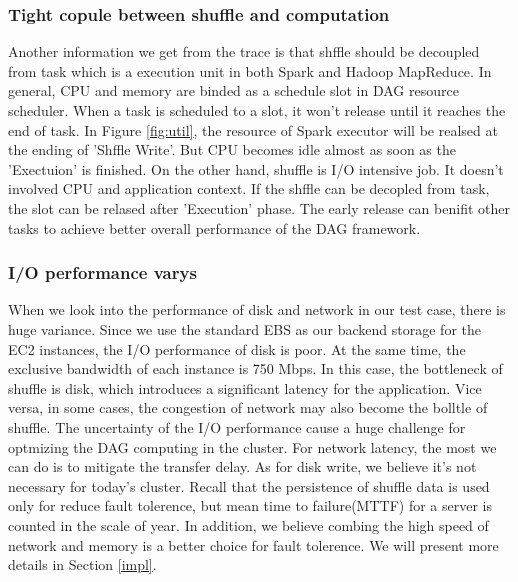 \documentclass[10pt,twocolumn]{article}
\begin{document}
\subsubsection{Tight copule between shuffle and computation}
Another information we get from the trace is that shffle should be decoupled from task which is a execution unit in both Spark and Hadoop MapReduce. In general, CPU and memory are binded as a schedule slot in DAG resource scheduler. When a task is scheduled to a slot, it won't release until it reaches the end of task. In Figure \ref{fig:util}, the resource of Spark executor will be realsed at the ending of 'Shffle Write'.
But CPU becomes idle almost as soon as the 'Exectuion' is finished. On the other hand, shuffle is I/O intensive job. It doesn't involved CPU and application context. If the shffle can be decopled from task, the slot can be relased after 'Execution' phase. The early release can benifit other tasks to achieve better overall performance of the DAG framework.

\subsubsection{I/O performance varys}
When we look into the performance of disk and network in our test case, there is huge variance. Since we use the standard EBS as our backend storage for the EC2 instances, the I/O performance of disk is poor. 
At the same time, the exclusive bandwidth of each instance is 750 Mbps\cite{aws}. In this case, the bottleneck of shuffle is disk, which introduces a significant latency for the application. Vice versa, in some cases, the congestion of network may also become the bolltle of shuffle\cite{varys}. The uncertainty of the I/O performance cause a huge challenge for optmizing the DAG computing in the cluster. For network latency, the most we can do is to mitigate the transfer delay. As for disk write, we believe it's not necessary for today's cluster. Recall that the persistence of shuffle data is used only for reduce fault tolerence, but mean time to failure(MTTF) for a server is counted in the scale of year\cite{tachyon}. In addition, we believe combing the high speed of network and memory is a better choice for fault tolerence. We will present more details in Section \ref{impl}.
\end{document}
